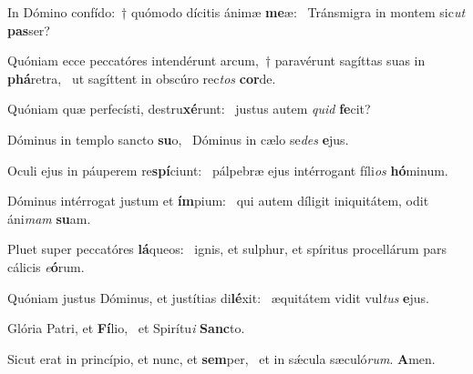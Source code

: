 \item In Dómino confído:~† quómodo dícitis ánimæ \textbf{me}æ:~\psstar{} Tránsmigra in montem sic\textit{ut} \textbf{pas}ser?
\item Quóniam ecce peccatóres intendérunt arcum,~† paravérunt sagíttas suas in \textbf{phá}retra,~\psstar{} ut sagíttent in obscúro rec\textit{tos} \textbf{cor}de.
\item Quóniam quæ perfecísti, destru\textbf{xé}runt:~\psstar{} justus autem \textit{quid} \textbf{fe}cit?
\item Dóminus in templo sancto \textbf{su}o,~\psstar{} Dóminus in cælo se\textit{des} \textbf{e}jus.
\item Oculi ejus in páuperem re\textbf{spí}ciunt:~\psstar{} pálpebræ ejus intérrogant fíli\textit{os} \textbf{hó}minum.
\item Dóminus intérrogat justum et \textbf{ím}pium:~\psstar{} qui autem díligit iniquitátem, odit áni\textit{mam} \textbf{su}am.
\item Pluet super peccatóres \textbf{lá}queos:~\psstar{} ignis, et sulphur, et spíritus procellárum pars cálicis \textit{e}\textbf{ó}rum.
\item Quóniam justus Dóminus, et justítias di\textbf{lé}xit:~\psstar{} æquitátem vidit vul\textit{tus} \textbf{e}jus.
\item Glória Patri, et \textbf{Fí}lio,~\psstar{} et Spirítu\textit{i} \textbf{Sanc}to.
\item Sicut erat in princípio, et nunc, et \textbf{sem}per,~\psstar{} et in sǽcula sæculó\textit{rum}. \textbf{A}men.
